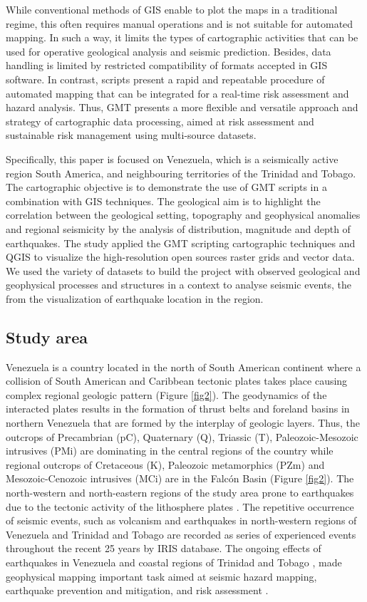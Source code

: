 \documentclass[sustainability,article,submit,pdftex,moreauthors]{Definitions/mdpi}
\begin{document}
While conventional methods of GIS enable to plot the maps in a traditional regime, this often requires manual operations and is not suitable for automated mapping. In such a way, it limits the types of cartographic activities that can be used for operative geological analysis and seismic prediction. Besides, data handling is limited by restricted compatibility of formats accepted in GIS software. In contrast, scripts present a rapid and repeatable procedure of automated mapping that can be integrated for a real-time risk assessment and hazard analysis. Thus, GMT presents a more flexible and versatile approach and strategy of cartographic data processing, aimed at risk assessment and sustainable risk management using multi-source datasets. 

Specifically, this paper is focused on Venezuela, which is a seismically active region South America, and neighbouring territories of the Trinidad and Tobago. The cartographic objective is to demonstrate the use of GMT scripts in a combination with GIS techniques. The geological aim is to highlight the correlation between the geological setting, topography and geophysical anomalies and regional seismicity by the analysis of distribution, magnitude and depth of earthquakes. The study applied the GMT scripting cartographic techniques and QGIS to visualize the high-resolution open sources raster grids and vector data. We used the variety of datasets to build the project with observed geological and geophysical processes and structures in a context to analyse seismic events, the from the visualization of earthquake location in the region. 

\subsection{Study area}

Venezuela is a country located in the north of South American continent where a collision of South American and Caribbean tectonic plates takes place causing complex regional geologic pattern (Figure \ref{fig2}). The geodynamics of the interacted plates results in the formation of thrust belts and foreland basins in northern Venezuela that are formed by the interplay of geologic layers. Thus, the outcrops of Precambrian (pC), Quaternary (Q), Triassic (T), Paleozoic-Mesozoic intrusives (PMi) are dominating in the central regions of the country while regional outcrops of Cretaceous (K), Paleozoic metamorphics (PZm) and Mesozoic-Cenozoic intrusives (MCi) are in the Falcón Basin (Figure \ref{fig2}). The north-western and north-eastern regions of the study area prone to earthquakes \cite{Audemard,Perez} due to the tectonic activity of the lithosphere plates \citep{Barr,Hayes}. The repetitive occurrence of seismic events, such as volcanism and earthquakes in north-western regions of Venezuela and Trinidad and Tobago are recorded as series of experienced events throughout the recent 25 years by IRIS database. The ongoing effects of earthquakes in Venezuela \citep{Audemard2006,Baumbach,Colon,Pousse2018,Rial,Yamazaki} and coastal regions of Trinidad and Tobago \citep{Deville,Latchman}, made geophysical mapping important task aimed at seismic hazard mapping, earthquake prevention and mitigation, and risk assessment \cite{Bucci}.
\end{document}
